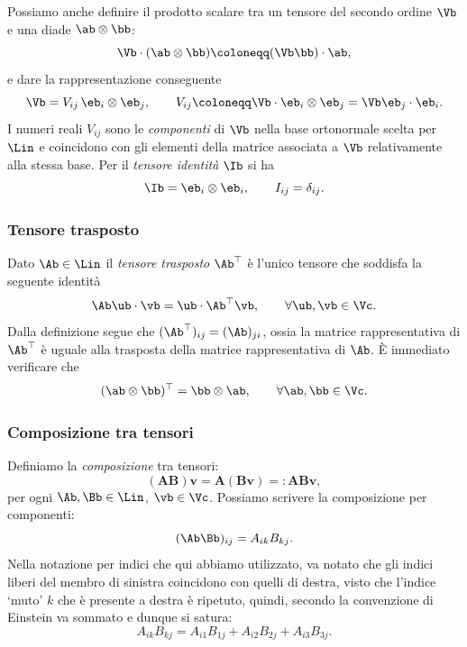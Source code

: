 Possiamo anche definire il prodotto scalare tra un tensore del secondo ordine $\Vb$ e una diade $\ab \otimes\bb$:
\begin{equation}
\Vb \cdot(\ab \otimes \bb)\coloneqq (\Vb\bb)\cdot \ab,
\end{equation}
e dare la rappresentazione conseguente
\begin{equation}
\Vb = V_{ij}\, \eb_i \otimes \eb_j, \qquad V_{ij}\coloneqq \Vb \cdot \eb_{i}\otimes\eb_j=\Vb \eb_j \cdot \eb_i.
\end{equation}
I numeri reali $V_{ij}$ sono le \textit{componenti} di $\Vb$ nella base ortonormale scelta per $\Lin$ e coincidono con gli elementi della matrice associata a $\Vb$ relativamente alla stessa base. Per il \textit{tensore identità} $\Ib$ si ha
\begin{equation}
\Ib = \eb_i \otimes \eb_i, \qquad I_{ij}=\delta_{ij}.
\end{equation}

\subsubsection{Tensore trasposto}
Dato $\Ab \in \Lin$ il \textit{tensore trasposto} $\Ab^\top$ è l'unico tensore che soddisfa la seguente identità
\begin{equation}
	\Ab \ub \cdot \vb =\ub \cdot \Ab^\top \vb, \qquad \forall \ub, \vb \in \Vc.
\end{equation}
Dalla definizione segue che $(\Ab^\top)_{ij}=(\Ab)_{ji}$, ossia la matrice rappresentativa di $\Ab^\top$ è uguale alla trasposta della matrice rappresentativa di $\Ab$.  È immediato verificare che
\begin{equation}
	(\ab \otimes \bb)^\top =\bb \otimes \ab, \qquad \forall \ab, \bb \in \Vc.
\end{equation}



\subsubsection{Composizione tra tensori}
Definiamo la  \textit{composizione} tra tensori:\begin{equation}
	(\mathbf{AB})\mathbf{v}=\mathbf{A}(\mathbf{B}\mathbf{v})=:\mathbf{A}\mathbf{B}\mathbf{v},
\end{equation}
per ogni $\Ab, \Bb \in \Lin$, $\vb \in \Vc$. Possiamo scrivere la composizione per componenti:
\begin{equation}
	(\Ab\Bb)_{ij}=A_{ik}B_{kj}.
\end{equation}
Nella notazione per indici che qui abbiamo utilizzato, va notato che gli indici liberi del membro di sinistra coincidono con quelli di destra, visto che l'indice `muto' $k$ che è presente a destra è ripetuto, quindi, secondo la convenzione di Einstein va sommato e dunque si satura:
\begin{equation}
A_{ik}B_{kj}=A_{i1}B_{1j}+A_{i2}B_{2j}+A_{i3}B_{3j}.
\end{equation}

